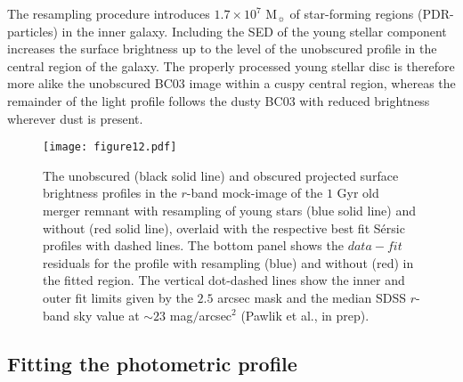 \documentclass[a4paper,fleqn,usenatbib]{mnras}
\begin{document}
 
The resampling procedure introduces $1.7 \times 10^7$ M$_{\sun}$ of star-forming regions (PDR-particles)
in the inner galaxy. Including the SED of the young stellar component increases the surface brightness  
up to the level of the unobscured profile in the central region of the galaxy. 
The properly processed young stellar disc is therefore more alike the unobscured BC03 image within a cuspy central region,
whereas the remainder of the light profile follows the dusty BC03 with reduced brightness wherever dust is present.

\begin{figure}
    \texttt{[image: figure12.pdf]}
    \caption{The unobscured (black solid line) and obscured projected surface 
    brightness profiles in the $r$-band mock-image of the $1$ Gyr old merger remnant
    with resampling of young stars (blue solid line) and without (red solid line), overlaid with the
    respective best fit S\'{e}rsic profiles with dashed lines.
    The bottom panel shows the $data-fit$ residuals for the profile with 
    resampling (blue) and without (red) in the fitted region. 
    The vertical dot-dashed lines show
    the inner and outer fit limits given by the $2.5$ arcsec mask and the median SDSS $r$-band sky value at 
    $\sim23$ mag$/$arcsec$^2$ (Pawlik et al., in prep).}
    \label{fig:light_profile_with_fits}
\end{figure}

\subsection{Fitting the photometric profile}
\end{document}
